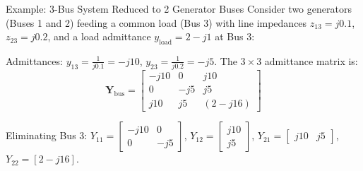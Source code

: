 \begin{frame}[allowframebreaks]{Example: 3-Bus System Reduced to 2 Generator Buses}
    Consider two generators (Buses 1 and 2) feeding a common load (Bus 3) with line impedances $z_{13} = j 0.1$, $z_{23} = j 0.2$, and a load admittance $y_{\text{load}} = 2 - j 1$ at Bus 3:
    \begin{center}
    \end{center}

    Admittances:
    $y_{13} = \frac{1}{j 0.1} = -j 10$, $y_{23} = \frac{1}{j 0.2} = -j 5$.
    The $3 \times 3$ admittance matrix is:
    \begin{equation}
        \mathbf{Y}_{\text{bus}} = \begin{bmatrix}
            -j 10 & 0 & j 10 \\
            0 & -j 5 & j 5 \\
            j 10 & j 5 & (2 - j 16)
        \end{bmatrix}
    \end{equation}

    Eliminating Bus 3:
    $Y_{11} = \begin{bmatrix} -j10 & 0 \\ 0 & -j5 \end{bmatrix}$,
    $Y_{12} = \begin{bmatrix} j10 \\ j5 \end{bmatrix}$,
    $Y_{21} = \begin{bmatrix} j10 & j5 \end{bmatrix}$,
    $Y_{22} = [2 - j16]$.


\end{frame}
